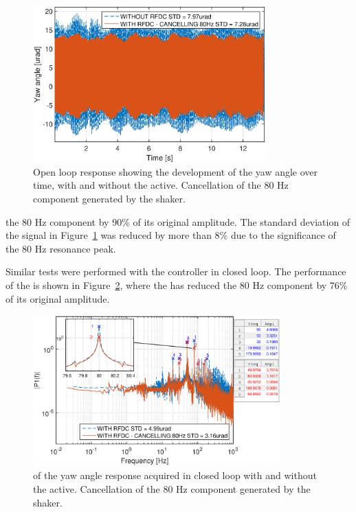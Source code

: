 \begin{figure}[h!]
  \centering %
  \includegraphics[width=0.8\textwidth, trim=0cm 0cm 0cm 0.7cm, clip=true]{fig/matlab/yl_openloop_ext_disturbance_80Hz}
  \caption{\label{fig:yl_openloop_80} Open loop response showing the development of the yaw angle over time, with and without the \abbrRFDC active. Cancellation of the 80 Hz component generated by the shaker.}
\end{figure}
\noindent
the 80 Hz component by 90\% of its original amplitude. The standard deviation of the signal in Figure~\ref{fig:yl_openloop_80} was reduced by more than 8\% due to the significance of the 80 Hz resonance peak.

Similar tests were performed with the controller in closed loop. The performance of the \abbrRFDC is shown in Figure~\ref{fig:fft_closedloop_80}, where the \abbrRFDC has reduced the 80 Hz component by 76\% of its original amplitude.

\begin{figure}[h!]
  \centering %
  \includegraphics[width=0.85\textwidth]{fig/matlab/fft_closedloop_ext_disturbance_80Hz_with_zoom_2}
  \caption{\label{fig:fft_closedloop_80} \abbrFFT of the yaw angle response acquired in closed loop with and without the \abbrRFDC active. Cancellation of the 80 Hz component generated by the shaker.}
\end{figure}

